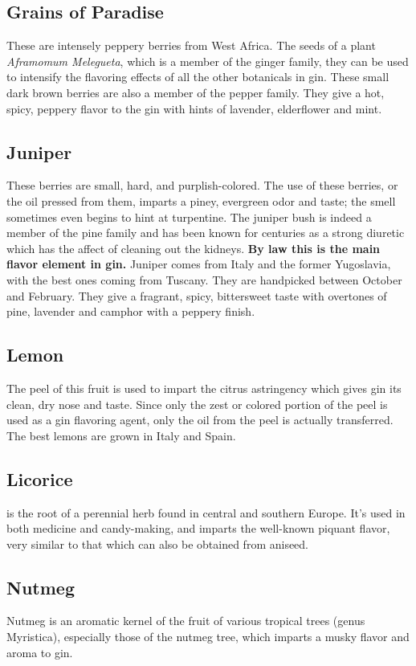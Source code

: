 \subsection*{Grains of Paradise} These are intensely
peppery berries from West Africa. The seeds of a plant \emph{Aframomum
Melegueta}, which is a member of the ginger family, they can be used to
intensify the flavoring effects of all the other botanicals in gin. These small
dark brown berries are also a member of the pepper family. They give a hot,
spicy, peppery flavor to the gin with hints of lavender, elderflower and mint.

\subsection*{Juniper} These berries are small, hard, and
purplish-colored. The use of these berries, or the oil pressed from them,
imparts a piney, evergreen odor and taste; the smell sometimes even begins to
hint at turpentine. The juniper bush is indeed a member of the pine family and
has been known for centuries as a strong diuretic which has the affect of
cleaning out the kidneys. \textbf{By law this is the main flavor element in
gin.} Juniper comes from Italy and the former Yugoslavia, with the best ones
coming from Tuscany. They are handpicked between October and February. They
give a fragrant, spicy, bittersweet taste with overtones of pine, lavender and
camphor with a peppery finish.

\subsection*{Lemon} The peel of this fruit is used to impart the
citrus astringency which gives gin its clean, dry nose and taste. Since only
the zest or colored portion of the peel is used as a gin flavoring agent, only
the oil from the peel is actually transferred. The best lemons are grown in
Italy and Spain.

\subsection*{Licorice} is the root of a perennial herb found in
central and southern Europe. It's used in both medicine and candy-making, and
imparts the well-known piquant flavor, very similar to that which can also be
obtained from aniseed.

\subsection*{Nutmeg} Nutmeg is an aromatic kernel of the fruit of
various tropical trees (genus Myristica), especially those of the nutmeg tree,
which imparts a musky flavor and aroma to gin.

